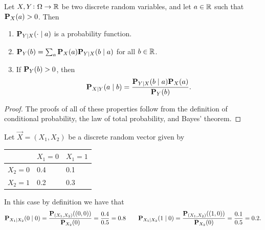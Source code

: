 \documentclass[11pt,a4paper]{article}
\begin{document}
\begin{proposition}
  Let $X,Y \colon \Omega \to \mathbb{R}$ be two discrete random variables,
  and let $a \in \mathbb{R}$ such that $\mathbf{P}_X(a) > 0$.
  Then
  \begin{enumerate}
    \item[(1)] $\mathbf{P}_{Y \mid X}(\cdot \mid a)$ is a probability function.
    \item[(2)] $\mathbf{P}_Y(b) = \sum_{a} \mathbf{P}_X(a) \mathbf{P}_{Y \mid X}(b \mid a)$
      for all $b \in \mathbb{R}$.
    \item[(3)] If $\mathbf{P}_Y(b) > 0$, then
    \[
      \mathbf{P}_{X \mid Y}(a \mid b) =
      \frac{\mathbf{P}_{Y \mid X}(b \mid a) \mathbf{P}_X(a)}{\mathbf{P}_Y(b)}.
    \]
  \end{enumerate}
\end{proposition}
\begin{proof}
  The proofs of all of these properties follow
  from the definition of conditional probability,
  the law of total probability,
  and Bayes' theorem.
\end{proof}

\begin{example}
  Let $\vec X = (X_1,X_2)$ be a discrete random vector given by
  \begin{center}
    \begin{tabular}{|l|l|l|}
    \hline
              & $X_1 = 0$ & $X_1 = 1$ \\ \hline
    $X_2 = 0$ & 0.4       & 0.1       \\ \hline
    $X_2 = 1$ & 0.2       & 0.3       \\ \hline
    \end{tabular}
  \end{center}
  In this case by definition we have that
  \[
    \mathbf{P}_{X_1 \mid X_2}(0 \mid 0) =
    \frac{\mathbf{P}_{(X_1,X_2)}((0,0))}{\mathbf{P}_{X_2}(0)} =
    \frac{0.4}{0.5} = 0.8 \qquad
    \mathbf{P}_{X_1 \mid X_2}(1 \mid 0) =
    \frac{\mathbf{P}_{(X_1,X_2)}((1,0))}{\mathbf{P}_{X_2}(0)} =
    \frac{0.1}{0.5} = 0.2.
  \]
\end{example}
\end{document}
